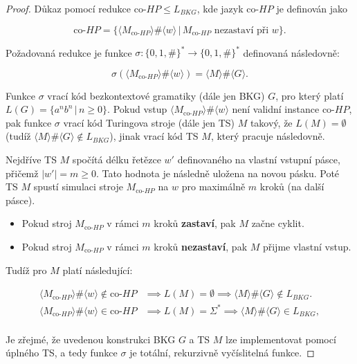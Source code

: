 \documentclass[a4paper, 12pt]{article}
\theoremstyle{definition}
\theoremstyle{definition}
\theoremstyle{definition}
\theoremstyle{remark}
\begin{document}
\begin{proof}
    Důkaz pomocí redukce $\text{co-}HP \leq L_{BKG}$, kde jazyk $\text{co-}HP$ je definován jako
    
    $$\text{co-}HP = \{\langle M_{\text{co-}HP} \rangle\#\langle w \rangle \, | \, M_{\text{co-}HP} \text{ nezastaví při } w\}.$$

    \noindent
    Požadovaná redukce je funkce $\sigma: \{0, 1, \#\}^\ast \rightarrow \{0, 1, \#\}^\ast$ definovaná následovně:

    $$\sigma(\langle M_{\text{co-}HP} \rangle\#\langle w \rangle) = \langle M \rangle\#\langle G \rangle.$$

    Funkce $\sigma$ vrací kód bezkontextové gramatiky (dále jen BKG) $G$, pro který platí $L(G) = \{a^nb^n \, | \, n \geq 0\}$. Pokud vstup $\langle M_{\text{co-}HP} \rangle\#\langle w \rangle$ není validní instance $\text{co-}HP$, pak funkce $\sigma$ vrací kód Turingova stroje (dále jen TS) $M$ takový, že $L(M) = \emptyset$ (tudíž $\langle M \rangle\#\langle G \rangle \notin L_{BKG}$), jinak vrací kód TS $M$, který pracuje následovně.
    
    Nejdříve TS $M$ spočítá délku řetězce $w'$ definovaného na vlastní vstupní pásce, přičemž $|w'| = m \geq 0$. Tato hodnota je následně uložena na novou pásku. Poté TS $M$ spustí simulaci stroje $M_{\text{co-}HP}$ na $w$ pro maximálně $m$ kroků (na další pásce).

    \begin{itemize}
        \item Pokud stroj $M_{\text{co-}HP}$ v rámci $m$ kroků \textbf{zastaví}, pak $M$ začne cyklit.
        \item Pokud stroj $M_{\text{co-}HP}$ v rámci $m$ kroků \textbf{nezastaví}, pak $M$ přijme vlastní vstup.
        
    \end{itemize}

    \noindent
    Tudíž pro $M$ platí následující:

    \begin{align*}
        \langle M_{\text{co-}HP} \rangle\#\langle w \rangle \notin \text{co-}HP &\implies L(M) = \emptyset \implies \langle M \rangle\#\langle G \rangle \notin L_{BKG}. \\
        \langle M_{\text{co-}HP} \rangle\#\langle w \rangle \in \text{co-}HP &\implies L(M) = \Sigma^\ast \implies \langle M \rangle\#\langle G \rangle \in L_{BKG}, \\        
    \end{align*}

    Je zřejmé, že uvedenou konstrukci BKG $G$ a TS $M$ lze implementovat pomocí úplného TS, a tedy funkce $\sigma$ je totální, rekurzivně vyčíslitelná funkce.
\end{proof}
\end{document}
